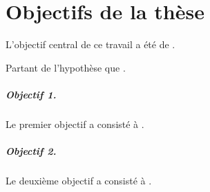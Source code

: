 \chapter*{Objectifs de la thèse} %


L’objectif central de ce travail a été de \lipsum[70].

Partant de l’hypothèse que \lipsum[60].

\paragraph{Objectif 1.}
Le premier objectif a consisté à \lipsum[60].

\paragraph{Objectif 2.}
Le deuxième objectif a consisté à \lipsum[60].

\lipsum[70]

\lipsum[70]

\lipsum[70]

\lipsum[70]

\lipsum[70]

\lipsum[70]

\lipsum[70]

\lipsum[70]

\lipsum[70]

\lipsum[70]

\lipsum[70]

\lipsum[70]

\lipsum[70]

\lipsum[70]

\lipsum[70]

\lipsum[70]

\lipsum[70]